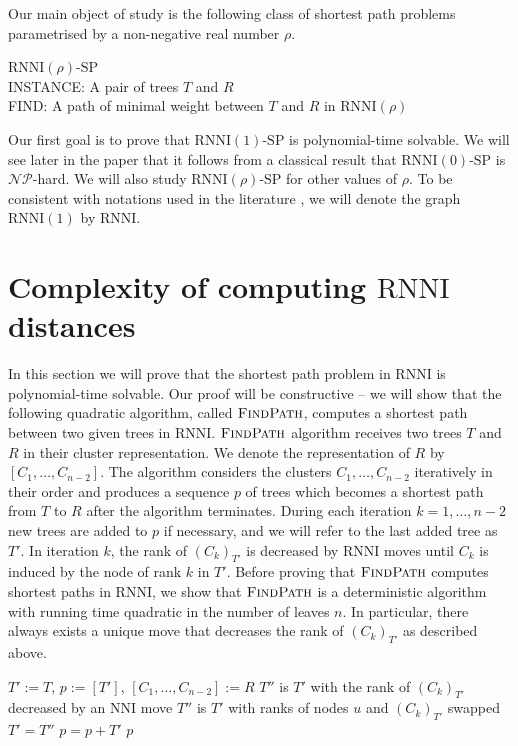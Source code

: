 \documentclass[11pt]{amsart}
\newcommand{\rnni}{\mathrm{RNNI}}
\newcommand{\findpath}{\textsc{FindPath}}
\newcommand{\rank}{\mathrm{rank}}
\newcommand{\nni}{\mathrm{NNI}}
\newcommand{\np}{\mathcal{NP}}
\newcommand{\decprob}[1]{\rnni(#1)\text{-}\mathrm{SP}}
\newcommand{\summary}[1]{} %
\begin{document}
Our main object of study is the following class of shortest path problems parametrised by a non-negative real number $\rho$.

\medskip

\noindent $\decprob{\rho}$
\medskip\\
INSTANCE: A pair of trees $T$ and $R$\\
FIND: A path of minimal weight between $T$ and $R$ in $\rnni(\rho)$

\medskip

Our first goal is to prove that $\decprob{1}$ is polynomial-time solvable.
We will see later in the paper that it follows from a classical result \autocite{Dasgupta2000-xa} that $\decprob{0}$ is $\np$-hard.
We will also study $\decprob{\rho}$ for other values of $\rho$.
To be consistent with notations used in the literature \autocite{Gavryushkin2018-ol}, we will denote the graph $\rnni(1)$ by $\rnni$.


\section{Complexity of computing $\rnni$ distances}
\label{sec:rnni_complexity}

\summary{Introducing $\findpath$.}
In this section we will prove that the shortest path problem in $\rnni$ is polynomial-time solvable.
Our proof will be constructive -- we will show that the following quadratic algorithm, called $\findpath$, computes a shortest path between two given trees in $\rnni$.
$\findpath$ algorithm receives two trees $T$ and $R$ in their cluster representation.
We denote the representation of $R$ by $[C_1, \ldots, C_{n-2}]$.
The algorithm considers the clusters $C_1, \ldots, C_{n-2}$ iteratively in their order and produces a sequence $p$ of trees which becomes a shortest path from $T$ to $R$ after the algorithm terminates.
During each iteration $k = 1, \ldots, n-2$ new trees are added to $p$ if necessary, and we will refer to the last added tree as $T'$.
In iteration $k$, the rank of $(C_{k})_{T'}$ is decreased by $\rnni$ moves until $C_k$ is induced by the node of rank $k$ in $T'$.
Before proving that $\findpath$ computes shortest paths in $\rnni$, we show that $\findpath$ is a deterministic algorithm with running time quadratic in the number of leaves $n$.
In particular, there always exists a unique move that decreases the rank of $(C_{k})_{T'}$ as described above.

\begin{algorithm}[H]
\caption{$\findpath$($T,R$)}
\begin{algorithmic}[1]
\STATE $T' := T$, $p := [T']$, $[C_1, \ldots, C_{n-2}] := R$
\label{alg:findpath:line:for_loop}
	\WHILE {$\rank((C_k)_{T'})>k$}
	\label{alg:findpath:line:while_loop}
			\STATE $T''$ is $T'$ with the rank of $(C_k)_{T'}$ decreased by an $\nni$ move
		\ELSE
			\STATE $T''$ is $T'$ with ranks of nodes $u$ and $(C_k)_{T'}$ swapped
		\ENDIF
		\STATE $T' = T''$
		\STATE $p = p+T'$
	\ENDWHILE
\ENDFOR
\RETURN $p$
\end{algorithmic}
\end{algorithm}
\end{document}
